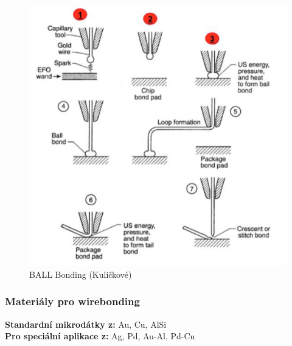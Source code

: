 \begin{figure}[h]
   \begin{center}
     \includegraphics[scale=0.6]{images/Ball.png}
   \end{center}
   \caption{BALL Bonding (Kuličkové)}
\end{figure}

\subsubsection{Materiály pro wirebonding}
\textbf{Standardní mikrodátky z:} Au, Cu, AlSi\\
\textbf{Pro speciální aplikace z:} Ag, Pd, Au-Al, Pd-Cu













